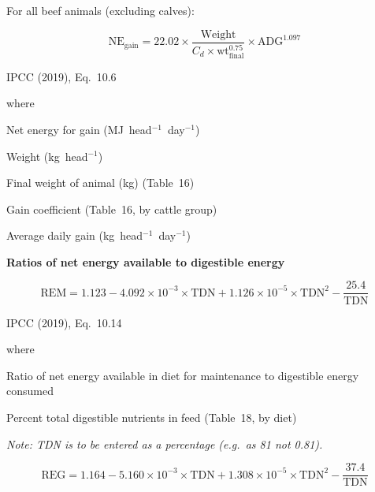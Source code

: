 \noindent For all beef animals (excluding calves):

\begin{equation}
    \mathrm{NE}_{\mathrm{gain}} = 22.02 \times
        \frac{\mathrm{Weight}}{C_d \times \mathrm{wt}_{\mathrm{final}}^{0.75}}
        \times \mathrm{ADG}^{1.097}
    \tag{Eq.\ 3.1.1.8}
\end{equation}

\noindent IPCC (2019), Eq.~10.6

\noindent where
\begin{description}[font=\normalfont, leftmargin=9em, style=sameline, nosep]
    \item[$\mathrm{NE}_{\mathrm{gain}}$] Net energy for gain (MJ~head$^{-1}$~day$^{-1}$)
    \item[$\mathrm{Weight}$] Weight (kg~head$^{-1}$)
    \item[$\mathrm{wt}_{\mathrm{final}}$] Final weight of animal (kg) (Table~16)
    \item[$C_d$] Gain coefficient (Table~16, by cattle group)
    \item[$\mathrm{ADG}$] Average daily gain (kg~head$^{-1}$~day$^{-1}$)
\end{description}

\bigskip
\noindent\textbf{Ratios of net energy available to digestible energy}

\begin{equation}
    \mathrm{REM} = 1.123 - 4.092 \times 10^{-3} \times \mathrm{TDN}
        + 1.126 \times 10^{-5} \times \mathrm{TDN}^{2}
        - \frac{25.4}{\mathrm{TDN}}
    \tag{Eq.\ 3.1.1.9}
\end{equation}

\noindent IPCC (2019), Eq.~10.14

\noindent where
\begin{description}[font=\normalfont, leftmargin=6em, style=sameline, nosep]
    \item[$\mathrm{REM}$] Ratio of net energy available in diet for maintenance to
          digestible energy consumed
    \item[$\mathrm{TDN}$] Percent total digestible nutrients in feed (Table~18,
          by diet)
\end{description}

\noindent\textit{Note: TDN is to be entered as a percentage (e.g.\ as 81 not 0.81).}

\begin{equation}
    \mathrm{REG} = 1.164 - 5.160 \times 10^{-3} \times \mathrm{TDN}
        + 1.308 \times 10^{-5} \times \mathrm{TDN}^{2}
        - \frac{37.4}{\mathrm{TDN}}
    \tag{Eq.\ 3.1.1.10}
\end{equation}

